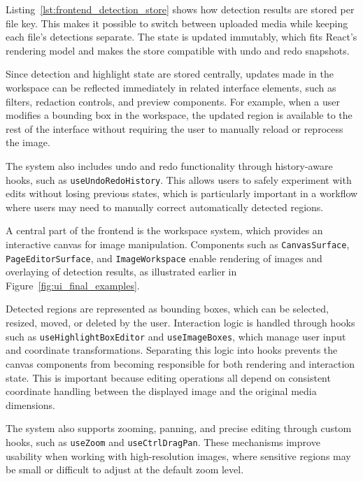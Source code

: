 Listing~\ref{lst:frontend_detection_store} shows how detection results are stored per file key. This makes it possible to switch between uploaded media while keeping each file's detections separate. The state is updated immutably, which fits React's rendering model and makes the store compatible with undo and redo snapshots.

Since detection and highlight state are stored centrally, updates made in the workspace can be reflected immediately in related interface elements, such as filters, redaction controls, and preview components. For example, when a user modifies a \gls{bounding box} in the workspace, the updated region is available to the rest of the interface without requiring the user to manually reload or reprocess the image.

The system also includes undo and redo functionality through history-aware hooks, such as \texttt{useUndoRedoHistory}. This allows users to safely experiment with edits without losing previous states, which is particularly important in a workflow where users may need to manually correct automatically detected regions.


A central part of the frontend is the workspace system, which provides an interactive canvas for image manipulation. Components such as \texttt{CanvasSurface}, \texttt{PageEditorSurface}, and \texttt{ImageWorkspace} enable rendering of images and overlaying of detection results, as illustrated earlier in Figure~\ref{fig:ui_final_examples}.

Detected regions are represented as \gls{bounding box}es, which can be selected, resized, moved, or deleted by the user. Interaction logic is handled through hooks such as \texttt{useHighlightBoxEditor} and \texttt{useImageBoxes}, which manage user input and coordinate transformations. Separating this logic into hooks prevents the canvas components from becoming responsible for both rendering and interaction state. This is important because editing operations all depend on consistent coordinate handling between the displayed image and the original media dimensions.

The system also supports zooming, panning, and precise editing through custom hooks, such as \texttt{useZoom} and \texttt{useCtrlDragPan}. These mechanisms improve usability when working with high-resolution images, where sensitive regions may be small or difficult to adjust at the default zoom level.

